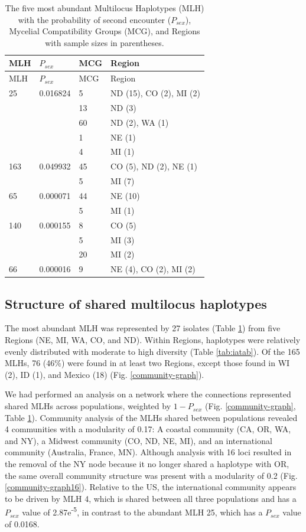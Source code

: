 \documentclass[fleqn,10pt,lineno]{wlpeerj} %
\theoremstyle{definition}
\theoremstyle{definition}
\theoremstyle{definition}
\theoremstyle{remark}
\begin{document}
\begin{longtable}[]{@{}llll@{}}
\caption{\label{tab:mlg-table} The five most abundant Multilocus Haplotypes
(MLH) with the probability of second encounter (\(P_{sex}\)), Mycelial
Compatibility Groups (MCG), and Regions with sample sizes in
parentheses.}\tabularnewline
\toprule
MLH & \(P_{sex}\) & MCG & Region\tabularnewline
\midrule
\endfirsthead
\toprule
MLH & \(P_{sex}\) & MCG & Region\tabularnewline
\midrule
\endhead
25 & 0.016824 & 5 & ND (15), CO (2), MI (2)\tabularnewline
& & 13 & ND (3)\tabularnewline
& & 60 & ND (2), WA (1)\tabularnewline
& & 1 & NE (1)\tabularnewline
& & 4 & MI (1)\tabularnewline
163 & 0.049932 & 45 & CO (5), ND (2), NE (1)\tabularnewline
& & 5 & MI (7)\tabularnewline
65 & 0.000071 & 44 & NE (10)\tabularnewline
& & 5 & MI (1)\tabularnewline
140 & 0.000155 & 8 & CO (5)\tabularnewline
& & 5 & MI (3)\tabularnewline
& & 20 & MI (2)\tabularnewline
66 & 0.000016 & 9 & NE (4), CO (2), MI (2)\tabularnewline
\bottomrule
\end{longtable}

\subsection*{Structure of shared multilocus
haplotypes}\label{structure-of-shared-multilocus-haplotypes}

The most abundant MLH was represented by 27 isolates (Table
\ref{tab:mlg-table}) from five Regions (NE, MI, WA, CO, and ND). Within
Regions, haplotypes were relatively evenly distributed with moderate to
high diversity (Table \ref{tab:iatab}). Of the 165 MLHs, 76 (46\%) were
found in at least two Regions, except those found in WI (2), ID (1), and
Mexico (18) (Fig. \ref{community-graph}).

We had performed an analysis on a network where the connections
represented shared MLHs across populations, weighted by \(1 - P_{sex}\)
(Fig. \ref{community-graph}, Table \ref{tab:mlg-table}). Community
analysis of the MLHs shared between populations revealed 4 communities
with a modularity of 0.17: A coastal community (CA, OR, WA, and NY), a
Midwest community (CO, ND, NE, MI), and an international community
(Australia, France, MN). Although analysis with 16 loci resulted in the
removal of the NY node because it no longer shared a haplotype with OR,
the same overall community structure was present with a modularity of
0.2 (Fig. \ref{community-graph16}). Relative to the US, the
international community appears to be driven by MLH 4, which is shared
between all three populations and has a \(P_{sex}\) value of
2.87e\textsuperscript{-5}, in contrast to the abundant MLH 25, which has
a \(P_{sex}\) value of 0.0168.
\end{document}
